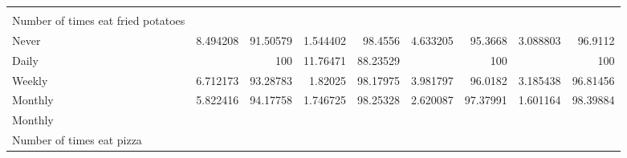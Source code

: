 \documentclass{article}
\begin{document}
\begin{tabular}{lllllllll}
  \multicolumn{1}{r}{} &
  \multicolumn{1}{r}{} &
  \multicolumn{1}{r}{} \\
\multicolumn{1}{l}{\hspace{6em}Number of times eat fried potatoes} &
  \multicolumn{1}{|r}{} &
  \multicolumn{1}{r}{} &
  \multicolumn{1}{r}{} &
  \multicolumn{1}{r}{} &
  \multicolumn{1}{r}{} &
  \multicolumn{1}{r}{} &
  \multicolumn{1}{r}{} &
  \multicolumn{1}{r}{} \\
\multicolumn{1}{l}{\hspace{7em}Never} &
  \multicolumn{1}{|r}{8.494208} &
  \multicolumn{1}{r}{91.50579} &
  \multicolumn{1}{r}{1.544402} &
  \multicolumn{1}{r}{98.4556} &
  \multicolumn{1}{r}{4.633205} &
  \multicolumn{1}{r}{95.3668} &
  \multicolumn{1}{r}{3.088803} &
  \multicolumn{1}{r}{96.9112} \\
\multicolumn{1}{l}{\hspace{7em}Daily} &
  \multicolumn{1}{|r}{} &
  \multicolumn{1}{r}{100} &
  \multicolumn{1}{r}{11.76471} &
  \multicolumn{1}{r}{88.23529} &
  \multicolumn{1}{r}{} &
  \multicolumn{1}{r}{100} &
  \multicolumn{1}{r}{} &
  \multicolumn{1}{r}{100} \\
\multicolumn{1}{l}{\hspace{7em}Weekly} &
  \multicolumn{1}{|r}{6.712173} &
  \multicolumn{1}{r}{93.28783} &
  \multicolumn{1}{r}{1.82025} &
  \multicolumn{1}{r}{98.17975} &
  \multicolumn{1}{r}{3.981797} &
  \multicolumn{1}{r}{96.0182} &
  \multicolumn{1}{r}{3.185438} &
  \multicolumn{1}{r}{96.81456} \\
\multicolumn{1}{l}{\hspace{7em}Monthly} &
  \multicolumn{1}{|r}{5.822416} &
  \multicolumn{1}{r}{94.17758} &
  \multicolumn{1}{r}{1.746725} &
  \multicolumn{1}{r}{98.25328} &
  \multicolumn{1}{r}{2.620087} &
  \multicolumn{1}{r}{97.37991} &
  \multicolumn{1}{r}{1.601164} &
  \multicolumn{1}{r}{98.39884} \\
\multicolumn{1}{l}{\hspace{3em}Monthly} &
  \multicolumn{1}{|r}{} &
  \multicolumn{1}{r}{} &
  \multicolumn{1}{r}{} &
  \multicolumn{1}{r}{} &
  \multicolumn{1}{r}{} &
  \multicolumn{1}{r}{} &
  \multicolumn{1}{r}{} &
  \multicolumn{1}{r}{} \\
\multicolumn{1}{l}{\hspace{4em}Number of times eat pizza} &
  \multicolumn{1}{|r}{} &
  \multicolumn{1}{r}{} &
  \multicolumn{1}{r}{} &
  \multicolumn{1}{r}{} &
  \multicolumn{1}{r}{} &
  \multicolumn{1}{r}{} &
  \multicolumn{1}{r}{} &
  \multicolumn{1}{r}{} \\

\end{tabular}
\end{document}
